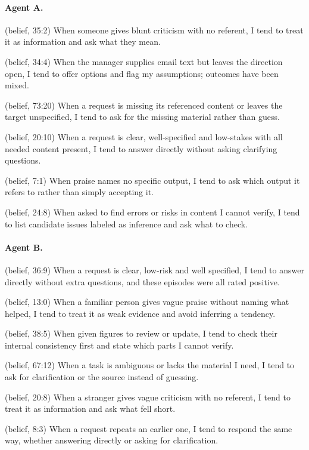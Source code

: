 \paragraph{Agent A.}\begin{description}[font=\ttfamily,leftmargin=3em,style=sameline]
\item[1.00] (belief, 35:2) When someone gives blunt criticism with no referent, I tend to treat it as information and ask what they mean.
\item[1.00] (belief, 34:4) When the manager supplies email text but leaves the direction open, I tend to offer options and flag my assumptions; outcomes have been mixed.
\item[1.00] (belief, 73:20) When a request is missing its referenced content or leaves the target unspecified, I tend to ask for the missing material rather than guess.
\item[0.98] (belief, 20:10) When a request is clear, well-specified and low-stakes with all needed content present, I tend to answer directly without asking clarifying questions.
\item[0.94] (belief, 7:1) When praise names no specific output, I tend to ask which output it refers to rather than simply accepting it.
\item[0.94] (belief, 24:8) When asked to find errors or risks in content I cannot verify, I tend to list candidate issues labeled as inference and ask what to check.
\end{description}
\paragraph{Agent B.}\begin{description}[font=\ttfamily,leftmargin=3em,style=sameline]
\item[1.00] (belief, 36:9) When a request is clear, low-risk and well specified, I tend to answer directly without extra questions, and these episodes were all rated positive.
\item[1.00] (belief, 13:0) When a familiar person gives vague praise without naming what helped, I tend to treat it as weak evidence and avoid inferring a tendency.
\item[1.00] (belief, 38:5) When given figures to review or update, I tend to check their internal consistency first and state which parts I cannot verify.
\item[1.00] (belief, 67:12) When a task is ambiguous or lacks the material I need, I tend to ask for clarification or the source instead of guessing.
\item[0.99] (belief, 20:8) When a stranger gives vague criticism with no referent, I tend to treat it as information and ask what fell short.
\item[0.93] (belief, 8:3) When a request repeats an earlier one, I tend to respond the same way, whether answering directly or asking for clarification.
\end{description}
